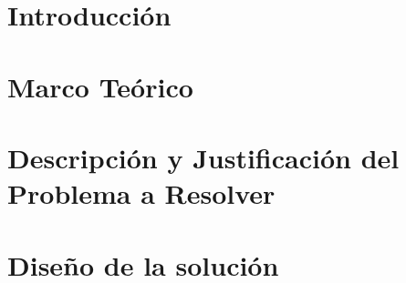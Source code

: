 \documentclass{article}
\begin{document}
\tableofcontents %

\newpage %



\section{Introducción}\label{sec:intr}



\section{Marco Teórico}\label{sec:marc}




\section{Descripción y Justificación del Problema a Resolver}\label{sec:descr}




\section{Diseño de la solución}\label{sec:dis}
\end{document}
